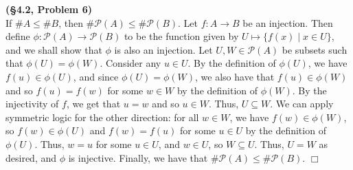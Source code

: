 \documentclass[12pt]{article}
\theoremstyle{definition}
\newenvironment{Solution}{\noindent {\sc Solution.}}{$\Box$ \vspace{2 ex}}
\begin{document}
\vspace{0.5cm}

\begin{Solution}
{\bf (\S4.2, Problem 6)}\\
If $\# A \le \# B$, then $\#\mathcal P(A) \le \# \mathcal P(B)$. Let $f : A \to B$ be an injection. Then define $\phi : \mathcal P(A) \to \mathcal P(B)$ to be the function given by $U \mapsto \{f(x) \mid x \in U\}$, and we shall show that $\phi$ is also an injection. Let $U,W \in \mathcal P(A)$ be subsets such that $\phi(U) =\phi(W)$. Consider any $u \in U$. By the definition of $\phi(U)$, we have $f(u)\in \phi(U)$, and since $\phi(U)=\phi(W)$, we also have that $f(u) \in \phi(W)$ and so $f(u)=f(w)$ for some $w \in W$ by the definition of $\phi(W)$. By the injectivity of $f$, we get that $u = w$ and so $u \in W$. Thus, $U \subseteq W$. We can apply symmetric logic for the other direction: for all $w \in W$, we have $f(w) \in \phi(W)$, so $f(w) \in \phi(U)$ and $f(w) = f(u)$ for some $u \in U$ by the definition of $\phi (U)$. Thus, $w = u$ for some $u \in U$, and $w \in U$, so $W \subseteq U$. Thus, $U=W$ as desired, and $\phi$ is injective. Finally, we have that $\#\mathcal P(A) \le \#\mathcal P(B)$.
\end{Solution}

\vspace{0.5cm}
\end{document}
